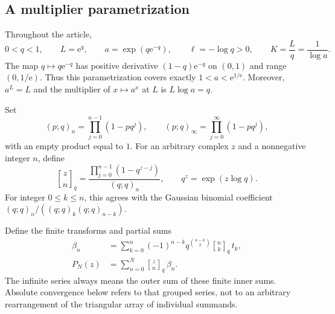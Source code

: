 \documentclass[11pt,letterpaper]{article}
\theoremstyle{definition}\newtheorem{definition}[theorem]{Definition}
\theoremstyle{remark}\newtheorem{remark}[theorem]{Remark}
\newcommand{\qb}[2]{\genfrac{[}{]}{0pt}{}{#1}{#2}_{\!q}}
\newcommand{\ee}{\mathrm e}
\numberwithin{equation}{section}
\begin{document}
\subsection{A multiplier parametrization}
Throughout the article,
\begin{equation}\label{eq:param}
 0<q<1,\qquad L=\ee^q,\qquad a=\exp(q\ee^{-q}),\qquad
 \ell=-\log q>0,\qquad K=\frac{L}{q}=\frac1{\log a}.
\end{equation}
The map $q\mapsto q\ee^{-q}$ has positive derivative $(1-q)\ee^{-q}$ on $(0,1)$ and range $(0,1/\ee)$. Thus this parametrization covers exactly $1<a<\ee^{1/\ee}$. Moreover, $a^L=L$ and the multiplier of $x\mapsto a^x$ at $L$ is $L\log a=q$.

Set
\begin{equation}\label{eq:poch}
 (p;q)_n=\prod_{j=0}^{n-1}(1-pq^j),\qquad
 (p;q)_\infty=\prod_{j=0}^{\infty}(1-pq^j),
\end{equation}
with an empty product equal to $1$. For an arbitrary complex $z$ and a nonnegative integer $n$, define
\begin{equation}\label{eq:qbin}
 \qb zn=\frac{\prod_{j=0}^{n-1}(1-q^{z-j})}{(q;q)_n},
 \qquad q^z=\exp(z\log q).
\end{equation}
For integer $0\leq k\leq n$, this agrees with the Gaussian binomial coefficient $(q;q)_n/((q;q)_k(q;q)_{n-k})$.

Define the finite transforms and partial sums
\begin{align}
 \beta_n&=\sum_{k=0}^{n}(-1)^{n-k}q^{\binom{n-k}{2}}\qb nk\,t_k,
 \label{eq:beta}\\
 P_N(z)&=\sum_{n=0}^{N}\qb zn\,\beta_n.
 \label{eq:PN}
\end{align}
The infinite series always means the outer sum of these finite inner sums. Absolute convergence below refers to that grouped series, not to an arbitrary rearrangement of the triangular array of individual summands.
\end{document}
